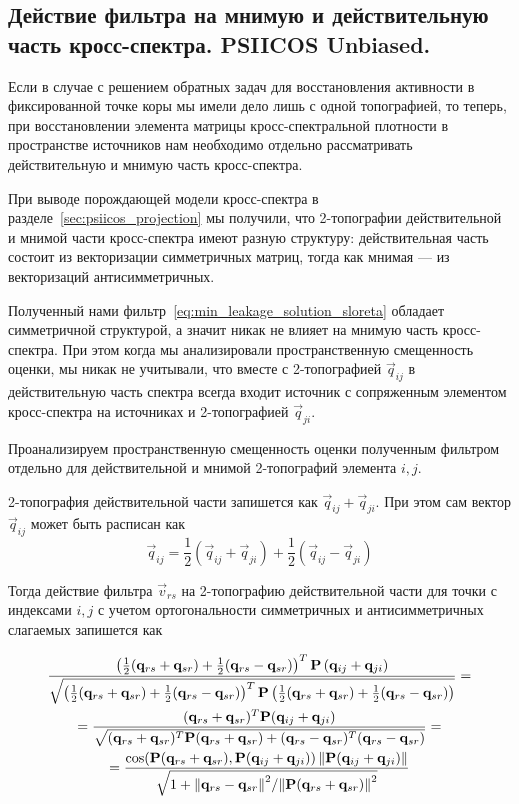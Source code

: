 \subsection{Действие фильтра на мнимую и действительную часть кросс-спектра. PSIICOS Unbiased.}

Если в случае с решением обратных задач для восстановления активности в
фиксированной точке коры мы имели дело лишь с одной топографией, то теперь, при
восстановлении элемента матрицы кросс-спектральной плотности в пространстве
источников нам необходимо отдельно рассматривать действительную и мнимую часть
кросс-спектра.

При выводе порождающей модели кросс-спектра в разделе~\ref{sec:psiicos_projection}
мы получили, что 2-топографии действительной и
мнимой части кросс-спектра имеют разную структуру: действительная часть состоит
из векторизации симметричных матриц, тогда как мнимая --- из векторизаций
антисимметричных.

Полученный нами фильтр~\ref{eq:min_leakage_solution_sloreta} обладает симметричной
структурой, а значит никак не влияет на мнимую часть кросс-спектра. При этом
когда мы анализировали пространственную смещенность оценки, мы никак не учитывали, что
вместе с 2-топографией $\vec{q}_{ij}$ в действительную часть спектра всегда входит
источник с сопряженным элементом кросс-спектра на источниках и 2-топографией $\vec{q}_{ji}$.

Проанализируем пространственную смещенность оценки полученным фильтром отдельно
для действительной и мнимой 2-топографий элемента $i, j$.

2-топография действительной части запишется как $\vec{q}_{ij} + \vec{q}_{ji}$.
При этом сам вектор $\vec{q}_{ij}$ может быть расписан как
\begin{equation}
\vec{q}_{ij} = \frac{1}{2} (\vec{q}_{ij} + \vec{q}_{ji}) + \frac{1}{2} (\vec{q}_{ij} - \vec{q}_{ji})
\end{equation}

Тогда действие фильтра $\vec{v}_{rs}$ на 2-топографию действительной части для
точки с индексами $i, j$ с учетом ортогональности симметричных и
антисимметричных слагаемых запишется как

\begin{multline}
    \frac{\left(\frac{1}{2} (\mathbf{q}_{rs} + \mathbf{q}_{sr}) + \frac{1}{2} (\mathbf{q}_{rs} - \mathbf{q}_{sr})\right)^T\mathbf{P}\left(\mathbf{q}_{ij} + \mathbf{q}_{ji}\right)}
    {\sqrt{\left(\frac{1}{2} (\mathbf{q}_{rs} + \mathbf{q}_{sr}) + \frac{1}{2}
    (\mathbf{q}_{rs} - \mathbf{q}_{sr})\right)^T\mathbf{P}\left(\frac{1}{2} (\mathbf{q}_{rs}
    + \mathbf{q}_{sr}) + \frac{1}{2} (\mathbf{q}_{rs} - \mathbf{q}_{sr})\right)}}  =\\
    =\frac{(\mathbf{q}_{rs} + \mathbf{q}_{sr})^T \mathbf{P} (\mathbf{q}_{ij} + \mathbf{q}_{ji})}
    {\sqrt{(\mathbf{q}_{rs} + \mathbf{q}_{sr})^T\mathbf{P}(\mathbf{q}_{rs} + \mathbf{q}_{sr}) + (\mathbf{q}_{rs} - \mathbf{q}_{sr})^T(\mathbf{q}_{rs} - \mathbf{q}_{sr})}} =\\
    = \frac{\cos(\mathbf{P}(\mathbf{q}_{rs} + \mathbf{q}_{sr}), \mathbf{P}(\mathbf{q}_{ij} + \mathbf{q}_{ji})) \left\lVert\mathbf{P}(\mathbf{q}_{ij} + \mathbf{q}_{ji})\right\rVert}
    {\sqrt{1 + {\left\lVert\mathbf{q}_{rs} - \mathbf{q}_{sr}\right\rVert^2}/{\left\lVert\mathbf{P}(\mathbf{q}_{rs} + \mathbf{q}_{sr})\right\rVert^2}}}
\end{multline}

